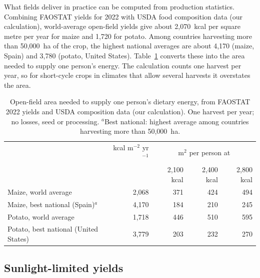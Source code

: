 What fields deliver in practice can be computed from production statistics. Combining FAOSTAT yields for 2022 \cite{faostat2025qcl} with USDA food composition data \cite{usdafdc2018srlegacy} (our calculation), world-average open-field yields give about 2{,}070~kcal per square metre per year for maize and 1{,}720 for potato. Among countries harvesting more than 50{,}000~ha of the crop, the highest national averages are about 4{,}170 (maize, Spain) and 3{,}780 (potato, United States). Table~\ref{tab:nutrition-field} converts these into the area needed to supply one person's energy. The calculation counts one harvest per year, so for short-cycle crops in climates that allow several harvests it overstates the area.

\begin{table}[H]
\centering
\caption{Open-field area needed to supply one person's dietary energy, from FAOSTAT 2022 yields and USDA composition data (our calculation). One harvest per year; no losses, seed or processing. $^{a}$Best national: highest average among countries harvesting more than 50{,}000~ha.}
\label{tab:nutrition-field}
\begin{tabular}{lrrrr}
\toprule
 & kcal m$^{-2}$ yr$^{-1}$ & \multicolumn{3}{c}{m$^2$ per person at} \\
 & & 2{,}100 kcal & 2{,}400 kcal & 2{,}800 kcal \\
\midrule
Maize, world average & 2{,}068 & 371 & 424 & 494 \\
Maize, best national (Spain)$^{a}$ & 4{,}170 & 184 & 210 & 245 \\
Potato, world average & 1{,}718 & 446 & 510 & 595 \\
Potato, best national (United States) & 3{,}779 & 203 & 232 & 270 \\
\bottomrule
\end{tabular}
\end{table}

\subsection{Sunlight-limited yields}\label{sec:nutrition-ceiling}

